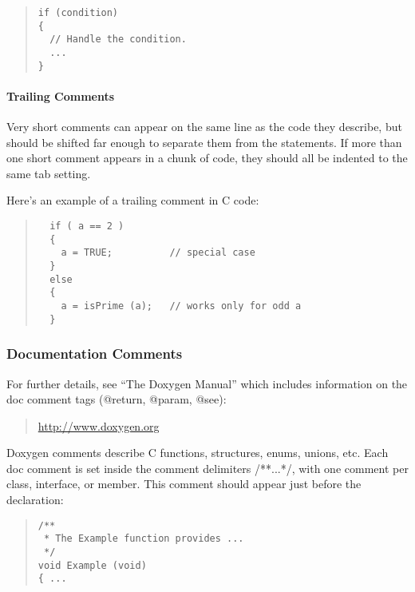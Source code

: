 \documentclass{article}
\begin{document}
\begin{quote}
\begin{verbatim}
if (condition) 
{
  // Handle the condition. 
  ...
}
\end{verbatim}
\end{quote}

\paragraph{Trailing Comments}
\label{sec:cguide:trailing_comments}

Very short comments can appear on the same line as the code they
describe, but should be shifted far enough to separate them from the
statements. If more than one short comment appears in a chunk of code,
they should all be indented to the same tab setting.

Here's an example of a trailing comment in C code: 

\begin{quote}
\begin{verbatim}
  if ( a == 2 ) 
  {
    a = TRUE;          // special case
  } 
  else 
  {
    a = isPrime (a);   // works only for odd a
  }
\end{verbatim}

\end{quote}

\subsubsection{Documentation Comments }
\label{sec:cguide:doc_comments} 

For further details, see ``The Doxygen Manual''
which includes information on the doc comment tags (@return, @param,
@see):

\begin{quote}
\url{http://www.doxygen.org}
\end{quote}

Doxygen comments describe C functions, structures, enums, unions,
etc. Each doc comment is set inside the comment delimiters /**...*/,
with one comment per class, interface, or member. This comment should
appear just before the declaration:

\begin{quote}
\begin{verbatim}
/**
 * The Example function provides ...
 */
void Example (void)
{ ...

\end{verbatim}
\end{quote}
\end{document}
